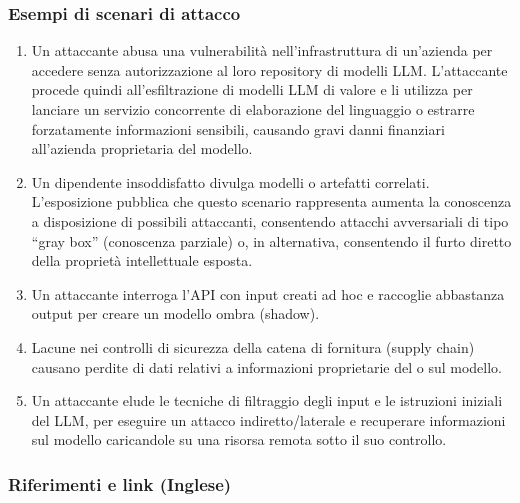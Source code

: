\documentclass[
]{article}
\providecommand{\tightlist}{%
  \setlength{\itemsep}{0pt}\setlength{\parskip}{0pt}}
\begin{document}
\subsubsection{Esempi di scenari di
attacco}\label{esempi-di-scenari-di-attacco}

\begin{enumerate}
\def\labelenumi{\arabic{enumi}.}
\tightlist
\item
  Un attaccante abusa una vulnerabilità nell'infrastruttura di
  un'azienda per accedere senza autorizzazione al loro repository di
  modelli LLM. L'attaccante procede quindi all'esfiltrazione di modelli
  LLM di valore e li utilizza per lanciare un servizio concorrente di
  elaborazione del linguaggio o estrarre forzatamente informazioni
  sensibili, causando gravi danni finanziari all'azienda proprietaria
  del modello.
\item
  Un dipendente insoddisfatto divulga modelli o artefatti correlati.
  L'esposizione pubblica che questo scenario rappresenta aumenta la
  conoscenza a disposizione di possibili attaccanti, consentendo
  attacchi avversariali di tipo ``gray box'' (conoscenza parziale) o, in
  alternativa, consentendo il furto diretto della proprietà
  intellettuale esposta.
\item
  Un attaccante interroga l'API con input creati ad hoc e raccoglie
  abbastanza output per creare un modello ombra (shadow).
\item
  Lacune nei controlli di sicurezza della catena di fornitura (supply
  chain) causano perdite di dati relativi a informazioni proprietarie
  del o sul modello.
\item
  Un attaccante elude le tecniche di filtraggio degli input e le
  istruzioni iniziali del LLM, per eseguire un attacco
  indiretto/laterale e recuperare informazioni sul modello caricandole
  su una risorsa remota sotto il suo controllo.
\end{enumerate}

\subsubsection{Riferimenti e link
(Inglese)}\label{riferimenti-e-link-inglese}
\end{document}
